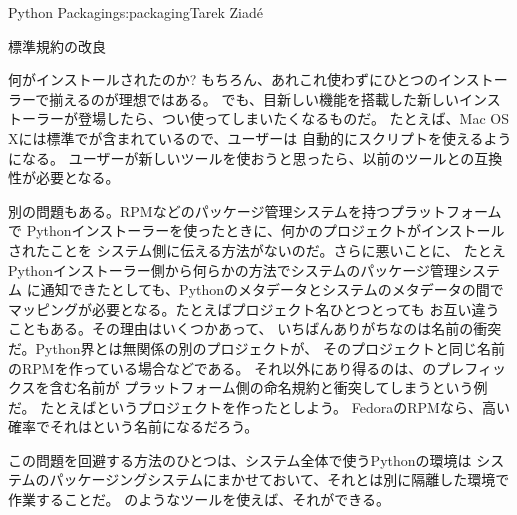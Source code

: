 \begin{aosachapter}{Python Packaging}{s:packaging}{Tarek Ziad\'{e}}
\begin{aosasect1}{標準規約の改良}
\begin{aosasect2}{何がインストールされたのか?}
もちろん、あれこれ使わずにひとつのインストーラーで揃えるのが理想ではある。
でも、目新しい機能を搭載した新しいインストーラーが登場したら、つい使ってしまいたくなるものだ。
たとえば、Mac OS Xには標準でが含まれているので、ユーザーは
自動的にスクリプトを使えるようになる。
ユーザーが新しいツールを使おうと思ったら、以前のツールとの互換性が必要となる。

別の問題もある。RPMなどのパッケージ管理システムを持つプラットフォームで
Pythonインストーラーを使ったときに、何かのプロジェクトがインストールされたことを
システム側に伝える方法がないのだ。さらに悪いことに、
たとえPythonインストーラー側から何らかの方法でシステムのパッケージ管理システム
に通知できたとしても、Pythonのメタデータとシステムのメタデータの間で
マッピングが必要となる。たとえばプロジェクト名ひとつとっても
お互い違うこともある。その理由はいくつかあって、
いちばんありがちなのは名前の衝突だ。Python界とは無関係の別のプロジェクトが、
そのプロジェクトと同じ名前のRPMを作っている場合などである。
それ以外にあり得るのは、のプレフィックスを含む名前が
プラットフォーム側の命名規約と衝突してしまうという例だ。
たとえばというプロジェクトを作ったとしよう。
FedoraのRPMなら、高い確率でそれはという名前になるだろう。

この問題を回避する方法のひとつは、システム全体で使うPythonの環境は
システムのパッケージングシステムにまかせておいて、それとは別に隔離した環境で作業することだ。
のようなツールを使えば、それができる。


\end{aosasect2}
\end{aosasect1}
\end{aosachapter}
